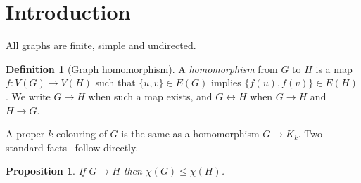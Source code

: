\documentclass{article}
\newtheorem{proposition}[theorem]{Proposition}
\theoremstyle{definition}
\newtheorem{definition}[theorem]{Definition}
\begin{document}
\begin{abstract}
For $\gamma$ we prove multiplicativity, monotonicity, and the transfer bound
$|G,K|\le\gamma(G,H)\,|H,K|$.  We find an exact identity for the loads of a
homomorphism to $K_3$ in terms of the degree sums of its colour classes.  From it,
every $d$-regular graph on $n$ vertices with an equitable $3$-colouring has
$\gamma(G,K_3)=\frac d2\bigl(\lceil n/3\rceil+[n\equiv2\ (3)]\bigr)$.  With the
Chen--Lih--Wu theorem this gives $\gamma(G,K_3)=3\lceil|V(G)|/6\rceil$ for every
connected cubic graph other than $K_4$ and $K_{3,3}$: prisms, M\"obius ladders,
generalized Petersen graphs and the Petersen graph itself.  For hypercubes,
$\gamma(Q_d,K_3)=d(2^d+2)/6$ for even $d$ and $d(2^d+4)/6$ for odd $d$.  For odd cycles as targets we show that every $d$-regular
$G$ satisfies $\gamma(G,C_m)\ge\frac d2M_m(n)$, where $M_m(n)$ is the least
$M\equiv n\pmod 2$ with $mM\ge n$; this is exact for cycles and tori.  We also
determine $\gamma(\cdot,K_3)$ for complete bipartite graphs, books, friendship
graphs, wheels and complete tripartite graphs.  For odd $m$ we determine
$\gamma(C_n,C_m)$ exactly: it is the least $M\equiv n\pmod 2$ with $mM\ge n$.  We also show that $\max(|G,H|,|H,G|)$ is not a pseudo-metric.

Every result in this paper is formally verified in the Lean~4 proof assistant
with the Mathlib library.
\end{abstract}

\section{Introduction}

All graphs are finite, simple and undirected.

\begin{definition}[Graph homomorphism]
A \emph{homomorphism} from $G$ to $H$ is a map $f\colon V(G)\to V(H)$ such that
$\{u,v\}\in E(G)$ implies $\{f(u),f(v)\}\in E(H)$.  We write $G\to H$ when such
a map exists, and $G\leftrightarrow H$ when $G\to H$ and $H\to G$.
\end{definition}

A proper $k$-colouring of $G$ is the same as a homomorphism $G\to K_k$.  Two
standard facts~\cite{hell2004} follow directly.

\begin{proposition}
\label{prop:chi_mono}
If $G\to H$ then $\chi(G)\le\chi(H)$.
\end{proposition}
\end{document}
